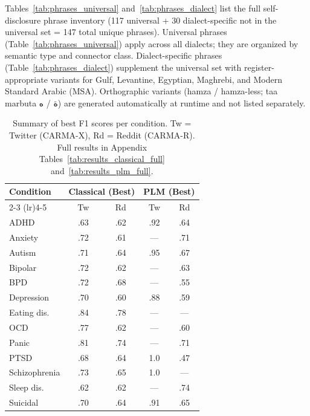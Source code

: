 \documentclass[11pt]{article}
\begin{document}
Tables~\ref{tab:phrases_universal} and~\ref{tab:phrases_dialect} list
the full self-disclosure phrase inventory (117 universal + 30 dialect-specific not in the universal set = 147 total unique phrases). Universal phrases
(Table~\ref{tab:phrases_universal}) apply across all dialects; they are
organized by semantic type and connector class. Dialect-specific phrases
(Table~\ref{tab:phrases_dialect}) supplement the universal set with
register-appropriate variants for Gulf, Levantine, Egyptian, Maghrebi,
and Modern Standard Arabic (MSA). Orthographic variants (hamza /
hamza-less; taa marbuta \foreignlanguage{arabic}{ة} /
\foreignlanguage{arabic}{ه}) are generated automatically at runtime and
not listed separately.

\begin{table}[t]
\nolinenumbers
\centering
\small
\begin{tabular}{lcccc}
\toprule
\multirow{2}{*}{Condition} & \multicolumn{2}{c}{Classical (Best)} & \multicolumn{2}{c}{PLM (Best)} \\
\cmidrule(lr){2-3} \cmidrule(lr){4-5}
 & Tw & Rd & Tw & Rd \\
\midrule
ADHD & .63 & .62 & .92 & .64 \\
Anxiety & .72 & .61 & --- & .71 \\
Autism & .71 & .64 & .95 & .67 \\
Bipolar & .72 & .62 & --- & .63 \\
BPD & .72 & .68 & --- & .55 \\
Depression & .70 & .60 & .88 & .59 \\
Eating dis. & .84 & .78 & --- & --- \\
OCD & .77 & .62 & --- & .60 \\
Panic & .81 & .74 & --- & .71 \\
PTSD & .68 & .64 & 1.0 & .47 \\
Schizophrenia & .73 & .65 & 1.0 & --- \\
Sleep dis. & .62 & .62 & --- & .74 \\
Suicidal & .70 & .64 & .91 & .65 \\
\bottomrule
\end{tabular}
\caption{Summary of best F1 scores per condition. Tw = Twitter (CARMA-X), Rd = Reddit (CARMA-R). Full results in Appendix Tables~\ref{tab:results_classical_full} and~\ref{tab:results_plm_full}.}
\label{tab:results_summary}
\end{table}
\linenumbers
\end{document}
